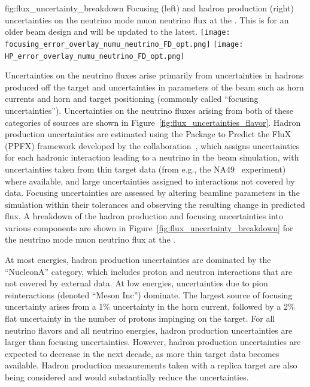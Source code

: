 
\begin{dunefigure}{fig:flux_uncertainty_breakdown}
{Focusing (left) and hadron production (right) uncertainties on the neutrino mode muon neutrino flux at the .  This is for an older beam design and will be updated to the latest.  }
\texttt{[image: focusing\_error\_overlay\_numu\_neutrino\_FD\_opt.png]}
    \texttt{[image: HP\_error\_overlay\_numu\_neutrino\_FD\_opt.png]}\end{dunefigure}

Uncertainties on the neutrino fluxes arise primarily from uncertainties in hadrons produced off the target and uncertainties in parameters of the beam such as horn currents and horn and target positioning (commonly called ``focusing uncertainties'').  Uncertainties on the neutrino fluxes arising from both of these categories of sources are shown in Figure~\ref{fig:flux_uncertainties_flavor}.  Hadron production uncertainties are estimated using the Package to Predict the FluX (PPFX) framework developed by the \minerva collaboration~\cite{Aliaga:2016oaz, AliagaSoplin:2016shs}, which assigns uncertainties for each hadronic interaction leading to a neutrino in the beam simulation, with uncertainties taken from thin target data (from e.g., the NA49~\cite{NA49} experiment) where available, and large uncertainties assigned to interactions not covered by data.  Focusing uncertainties are assessed by altering beamline parameters in the simulation within their tolerances and observing the resulting change in predicted flux.  A breakdown of the hadron production and focusing uncertainties into various components are shown in Figure~\ref{fig:flux_uncertainty_breakdown} for the neutrino mode muon neutrino flux at the .    

At most energies, hadron production uncertainties are dominated by the ``NucleonA'' category, which includes proton and neutron interactions that are not covered by external data.  At low energies, uncertainties due to pion reinteractions (denoted ``Meson Inc'') dominate.   The largest source of focusing uncertainty arises from a 1\% uncertainty in the horn current, followed by a 2\% flat uncertainty in the number of protons impinging on the target.   For all neutrino flavors and all neutrino energies, hadron production uncertainties are larger than focusing uncertainties.  However, hadron production uncertainties are expected to decrease in the next decade, as more thin target data becomes available.  Hadron production measurements taken with a replica target are also being considered and would substantially reduce the uncertainties.  

